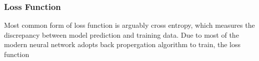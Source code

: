 \subsubsection{Loss Function}

Most common form of loss function is arguably cross entropy, which measures the discrepancy between model prediction and training data. Due to most of the modern neural network adopts back propergation algorithm to train, the loss function 